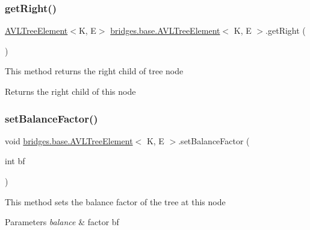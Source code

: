 \subsubsection{\texorpdfstring{get\+Right()}{getRight()}}
{\footnotesize\ttfamily \mbox{\hyperlink{classbridges_1_1base_1_1_a_v_l_tree_element}{A\+V\+L\+Tree\+Element}}$<$K, E$>$ \mbox{\hyperlink{classbridges_1_1base_1_1_a_v_l_tree_element}{bridges.\+base.\+A\+V\+L\+Tree\+Element}}$<$ K, E $>$.get\+Right (\begin{DoxyParamCaption}{ }\end{DoxyParamCaption})}

This method returns the right child of tree node

\begin{DoxyReturn}{Returns}
the right child of this node 
\end{DoxyReturn}
\mbox{\label{classbridges_1_1base_1_1_a_v_l_tree_element_a0dc3c83e750cc39535afb08ea92f6c98}} 
\subsubsection{\texorpdfstring{set\+Balance\+Factor()}{setBalanceFactor()}}
{\footnotesize\ttfamily void \mbox{\hyperlink{classbridges_1_1base_1_1_a_v_l_tree_element}{bridges.\+base.\+A\+V\+L\+Tree\+Element}}$<$ K, E $>$.set\+Balance\+Factor (\begin{DoxyParamCaption}\item[{int}]{bf }\end{DoxyParamCaption})}

This method sets the balance factor of the tree at this node


\begin{DoxyParams}{Parameters}
{\em balance} & factor bf \\
\hline
\end{DoxyParams}
\mbox{\label{classbridges_1_1base_1_1_a_v_l_tree_element_ac42b744989ed7e18dcbd52980e674b33}} 
